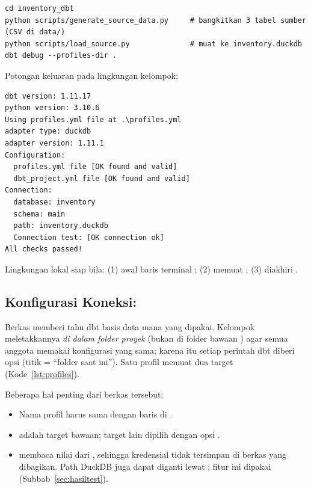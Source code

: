 \begin{lstlisting}[style=term]
cd inventory_dbt
python scripts/generate_source_data.py     # bangkitkan 3 tabel sumber (CSV di data/)
python scripts/load_source.py              # muat ke inventory.duckdb
dbt debug --profiles-dir .
\end{lstlisting}
Potongan keluaran  pada lingkungan kelompok:
\begin{lstlisting}[style=term, caption={Keluaran \kode{dbt debug --profiles-dir .} (diringkas dari \kode{logs/dbt\_debug.txt}).}, label={lst:debug}]
dbt version: 1.11.17
python version: 3.10.6
Using profiles.yml file at .\profiles.yml
adapter type: duckdb
adapter version: 1.11.1
Configuration:
  profiles.yml file [OK found and valid]
  dbt_project.yml file [OK found and valid]
Connection:
  database: inventory
  schema: main
  path: inventory.duckdb
  Connection test: [OK connection ok]
All checks passed!
\end{lstlisting}

\begin{cekberhasil}
Lingkungan lokal siap bila: (1) awal baris terminal ; (2)  memuat ; (3)  diakhiri .
\end{cekberhasil}

\subsection{Konfigurasi Koneksi: }\label{sec:profiles}
Berkas  memberi tahu dbt basis data mana yang dipakai. Kelompok meletakkannya \emph{di dalam folder proyek} (bukan di folder bawaan ) agar semua anggota memakai konfigurasi yang sama; karena itu setiap perintah dbt diberi opsi  (titik = ``folder saat ini''). Satu profil memuat dua target (Kode~\ref{lst:profiles}).



Beberapa hal penting dari berkas tersebut:
\begin{itemize}[nosep]
    \item Nama profil  harus sama dengan baris  di .
    \item {} adalah target bawaan; target lain dipilih dengan opsi .
    \item {} membaca nilai dari , sehingga kredensial tidak tersimpan di berkas yang dibagikan. Path DuckDB juga dapat diganti lewat ; fitur ini dipakai  (Subbab~\ref{sec:hasiltest}).
\end{itemize}


